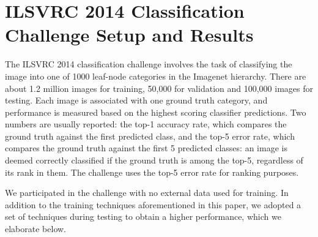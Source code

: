 \section{ILSVRC 2014 Classification Challenge Setup and Results}

The ILSVRC 2014 classification challenge involves the task of classifying the image into one of 1000 leaf-node categories in the Imagenet hierarchy. There are about 1.2 million images for training, 50,000 for validation and 100,000 images for testing. Each image is associated with one ground truth category, and performance is measured based on the highest scoring classifier predictions. Two numbers are usually reported: the top-1 accuracy rate, which compares the ground truth against the first predicted class, and the top-5 error rate, which compares the ground truth against the first 5 predicted classes: an image is deemed correctly classified if the ground truth is among the top-5, regardless of its rank in them. The challenge uses the top-5 error rate for ranking purposes.

We participated in the challenge with no external data used for training. In addition to the training techniques aforementioned in this paper, we adopted a set of techniques during testing to obtain a higher performance, which we elaborate below.

